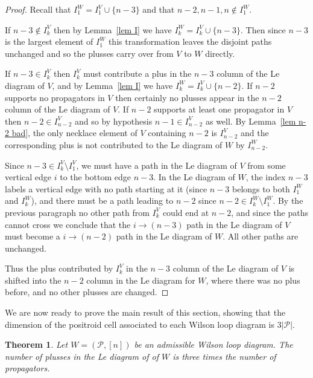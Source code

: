 \documentclass[11pt]{article}
\newcommand{\cP}{\mathcal{P}}
\newtheorem{thm}{Theorem}[section]
\theoremstyle{remark}
\theoremstyle{definition}
\begin{document}
\begin{proof}
Recall that $I_1^W = I_1^V\cup \{n-3\}$ and that $n-2,n-1,n \not\in I_1^W$.

  If $n-3\not\in I_{k}^{V}$ then by Lemma~\ref{lem I} we have $I_{k}^{W} = I_k^{V}\cup \{n-3\}$.  Then since $n-3$ is the largest element of $I_1^{W}$ this transformation leaves the disjoint paths unchanged and so the plusses carry over from $V$ to $W$ directly.

  If $n-3\in I_{k}^{V}$ then $I_k^V$ must contribute a plus in the $n-3$ column of the Le diagram of $V$, and by Lemma~\ref{lem I} we have $I_{k}^{W} = I_k^{V}\cup \{n-2\}$. If $n-2$ supports no propagators in $V$ then certainly no plusses appear in the $n-2$ column of the Le diagram of $V$. If $n-2$ supports at least one propagator in $V$ then $n-2 \in I_{n-2}^V$ and so by hypothesis $n-1 \in I_{n-2}^V$ as well. By Lemma~\ref{lem n-2 bad}, the only necklace element of $V$ containing $n-2$ is $I_{n-2}^{V}$ and the corresponding plus is not contributed to the Le diagram of $W$ by $I_{n-2}^{W}$.

  Since $n-3 \in I_k^V \setminus I_1^V$, we must have a path in the Le diagram of $V$ from some vertical edge $i$ to the bottom edge $n-3$.  In the Le diagram of $W$, the index $n-3$ labels a vertical edge with no path starting at it (since $n-3$ belongs to both $I_1^W$ and $I_k^W$), and there must be a path leading to $n-2$ since $n-2 \in I_k^W \setminus I_1^W$.  By the previous paragraph no other path from $I_k^V$ could end at $n-2$, and since the paths cannot cross we conclude that the $i\rightarrow (n-3)$ path in the Le diagram of $V$ must become a $i\rightarrow (n-2)$ path in the Le diagram of $W$. All other paths are unchanged.

   Thus the plus contributed by $I_k^V$ in the $n-3$ column of the Le diagram of $V$ is shifted into the $n-2$ column in the Le diagram for $W$, where there was no plus before, and no other plusses are changed.
\end{proof}

We are now ready to prove the main result of this section, showing that the dimension of the positroid cell associated to each Wilson loop diagram is $3|\cP|$. 

\begin{thm}\label{thm dim}
Let $W = (\cP, [n])$ be an admissible Wilson loop diagram.  The number of plusses in the Le diagram of of $W$ is three times the number of propagators.
\end{thm}
\end{document}
